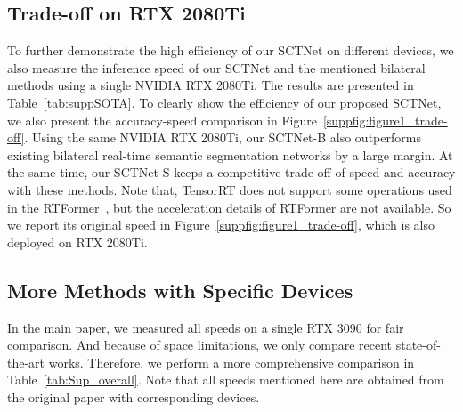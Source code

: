\documentclass[letterpaper]{article} %
\begin{document}
\subsection{Trade-off on RTX 2080Ti}\label{app:rtx2080}
 To further demonstrate the high efficiency of our SCTNet on different devices, we also measure the inference speed of our SCTNet and the mentioned bilateral methods using a single NVIDIA RTX 2080Ti. The results are presented in Table~\ref{tab:suppSOTA}.
 To clearly show the efficiency of our proposed SCTNet, we also present the accuracy-speed comparison in Figure~\ref{suppfig:figure1_trade-off}. Using the same NVIDIA RTX 2080Ti, our SCTNet-B also outperforms existing bilateral real-time semantic segmentation networks by a large margin. At the same time, our SCTNet-S keeps a competitive trade-off of speed and accuracy with these methods.
 Note that, TensorRT does not support some operations used in the RTFormer~\cite{wang2022rtformer}, but the acceleration details of RTFormer are not available. So we report its original speed in Figure~\ref{suppfig:figure1_trade-off}, which is also deployed on RTX 2080Ti.





\subsection{More Methods with Specific Devices}
In the main paper, we measured all speeds on a single RTX 3090 for fair comparison. And because of space limitations, we only compare recent state-of-the-art works. Therefore, we perform a more comprehensive comparison in Table~\ref{tab:Sup_overall}. Note that all speeds mentioned here are obtained from the original paper with corresponding devices.
\end{document}
